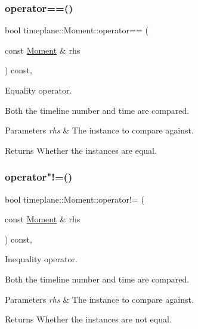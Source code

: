 \subsubsection{\texorpdfstring{operator==()}{operator==()}}
{\footnotesize\ttfamily bool timeplane\+::\+Moment\+::operator== (\begin{DoxyParamCaption}\item[{const \hyperlink{classtimeplane_1_1_moment}{Moment} \&}]{rhs }\end{DoxyParamCaption}) const\hspace{0.3cm}{\ttfamily [inline]}, {\ttfamily [noexcept]}}



Equality operator. 

Both the timeline number and time are compared. 
\begin{DoxyParams}{Parameters}
{\em rhs} & The instance to compare against. \\
\hline
\end{DoxyParams}
\begin{DoxyReturn}{Returns}
Whether the instances are equal. 
\end{DoxyReturn}
\mbox{\label{classtimeplane_1_1_moment_a2e50bd80270c77f8d1b9fdbc586efc7c}} 
\subsubsection{\texorpdfstring{operator"!=()}{operator!=()}}
{\footnotesize\ttfamily bool timeplane\+::\+Moment\+::operator!= (\begin{DoxyParamCaption}\item[{const \hyperlink{classtimeplane_1_1_moment}{Moment} \&}]{rhs }\end{DoxyParamCaption}) const\hspace{0.3cm}{\ttfamily [inline]}, {\ttfamily [noexcept]}}



Inequality operator. 

Both the timeline number and time are compared. 
\begin{DoxyParams}{Parameters}
{\em rhs} & The instance to compare against. \\
\hline
\end{DoxyParams}
\begin{DoxyReturn}{Returns}
Whether the instances are not equal. 
\end{DoxyReturn}
\mbox{\label{classtimeplane_1_1_moment_ac7870eb30ed18b8ea85bf7584632cd11}} 
